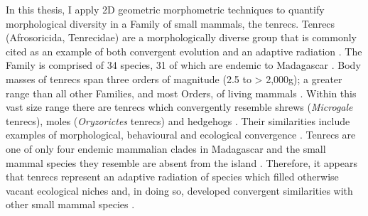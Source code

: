 	
	In this thesis, I apply 2D geometric morphometric techniques to quantify morphological diversity in a Family of small mammals, the tenrecs. Tenrecs (Afrosoricida, Tenrecidae) are a morphologically diverse group that is commonly cited as an example of both convergent evolution and an adaptive radiation \citep{Soarimalala2011, Eisenberg1969}. The Family is comprised of 34 species, 31 of which are endemic to Madagascar \citep{Olson2013}. Body masses of tenrecs span three orders of magnitude (2.5 to > 2,000g); a greater range than all other Families, and most Orders, of living mammals \citep{Olson2003}. Within this vast size range there are tenrecs which convergently resemble shrews (\textit{Microgale} tenrecs), moles (\textit{Oryzorictes} tenrecs) and hedgehogs \citep[\textit{Echinops} and \textit{Setifer} tenrecs,][Figure \ref{fig:tenrecs}]{Eisenberg1969}. Their similarities include examples of morphological, behavioural and ecological convergence \citep{Soarimalala2011}. Tenrecs are one of only four endemic mammalian clades in Madagascar and the small mammal species they resemble are absent from the island \citep{Garbutt1999}. Therefore, it appears that tenrecs represent an adaptive radiation of species which filled otherwise vacant ecological niches and, in doing so, developed convergent similarities with other small mammal species \citep{Soarimalala2011}.
	
